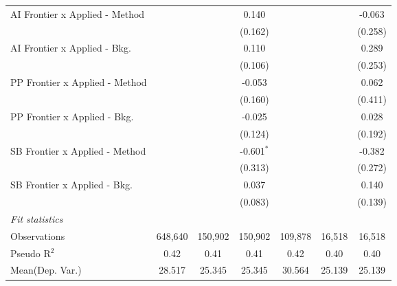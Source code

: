 \begin{tabular}{lcccccc}
   AI Frontier x Applied - Method &               &              & 0.140          &               &              & -0.063\\   
                                  &               &              & (0.162)        &               &              & (0.258)\\   
   AI Frontier x Applied - Bkg.   &               &              & 0.110          &               &              & 0.289\\   
                                  &               &              & (0.106)        &               &              & (0.253)\\   
   PP Frontier x Applied - Method &               &              & -0.053         &               &              & 0.062\\   
                                  &               &              & (0.160)        &               &              & (0.411)\\   
   PP Frontier x Applied - Bkg.   &               &              & -0.025         &               &              & 0.028\\   
                                  &               &              & (0.124)        &               &              & (0.192)\\   
   SB Frontier x Applied - Method &               &              & -0.601$^{*}$   &               &              & -0.382\\   
                                  &               &              & (0.313)        &               &              & (0.272)\\   
   SB Frontier x Applied - Bkg.   &               &              & 0.037          &               &              & 0.140\\   
                                  &               &              & (0.083)        &               &              & (0.139)\\   
   \midrule
   \emph{Fit statistics}\\
   Observations                   & 648,640       & 150,902      & 150,902        & 109,878       & 16,518       & 16,518\\  
   Pseudo R$^2$                   & 0.42          & 0.41         & 0.41           & 0.42          & 0.40         & 0.40\\  
Mean(Dep. Var.) & 28.517 & 25.345 & 25.345 & 30.564 & 25.139 & 25.139 \\
   

\end{tabular}
